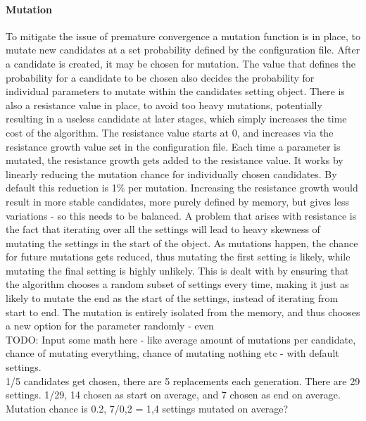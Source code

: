 \documentclass[a4paper,english]{report}
\begin{document}
		\paragraph{Mutation}
		To mitigate the issue of premature convergence a mutation function is in place, to mutate new candidates at a set probability defined by the configuration file. After a candidate is created, it may be chosen for mutation. The value that defines the probability for a candidate to be chosen also decides the probability for individual parameters to mutate within the candidates setting object. There is also a resistance value in place, to avoid too heavy mutations, potentially resulting in a useless candidate at later stages, which simply increases the time cost of the algorithm. The resistance value starts at 0, and increases via the resistance growth value set in the configuration file. Each time a parameter is mutated, the resistance growth gets added to the resistance value. It works by linearly reducing the mutation chance for individually chosen candidates. By default this reduction is 1\% per mutation. Increasing the resistance growth would result in more stable candidates, more purely defined by memory, but gives less variations - so this needs to be balanced. A problem that arises with resistance is the fact that iterating over all the settings will lead to heavy skewness of mutating the settings in the start of the object. As mutations happen, the chance for future mutations gets reduced, thus mutating the first setting is likely, while mutating the final setting is highly unlikely. This is dealt with by ensuring that the algorithm chooses a random subset of settings every time, making it just as likely to mutate the end as the start of the settings, instead of iterating from start to end. The mutation is entirely isolated from the memory, and thus chooses a new option for the parameter randomly - even 
		\\
		TODO: Input some math here - like average amount of mutations per candidate, chance of mutating everything, chance of mutating nothing etc - with default settings. \\
		1/5 candidates get chosen, there are 5 replacements each generation.
		There are 29 settings. 1/29, 14 chosen as start on average, and 7 chosen as end on average. Mutation chance is 0.2, 7/0,2 = 1,4 settings mutated on average?
		\\
\end{document}
